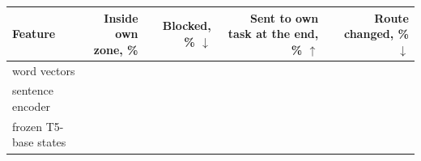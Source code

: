 {\footnotesize\setlength{\tabcolsep}{3pt}\begin{tabular}{lrrrr}
    \toprule
    Feature & \shortstack[r]{Inside own\\zone, \%} & \shortstack[r]{Blocked,\\\% $\downarrow$} & \shortstack[r]{Sent to\\own task\\at the end,\\\% $\uparrow$} & \shortstack[r]{Route\\changed,\\\% $\downarrow$} \\
    \midrule
    word vectors & \AudZoneWordVecInside{} & \AudZoneWordVecBlocked{} & \AudZoneWordVecOwn{} & \AudZoneWordVecChanged{} \\
    sentence encoder & \AudZoneSentenceInside{} & \AudZoneSentenceBlocked{} & \AudZoneSentenceOwn{} & \AudZoneSentenceChanged{} \\
    frozen T5-base states & \AudZoneFrozenTInside{} & \AudZoneFrozenTBlocked{} & \AudZoneFrozenTOwn{} & \AudZoneFrozenTChanged{} \\
    \bottomrule
\end{tabular}}
\par\medskip
